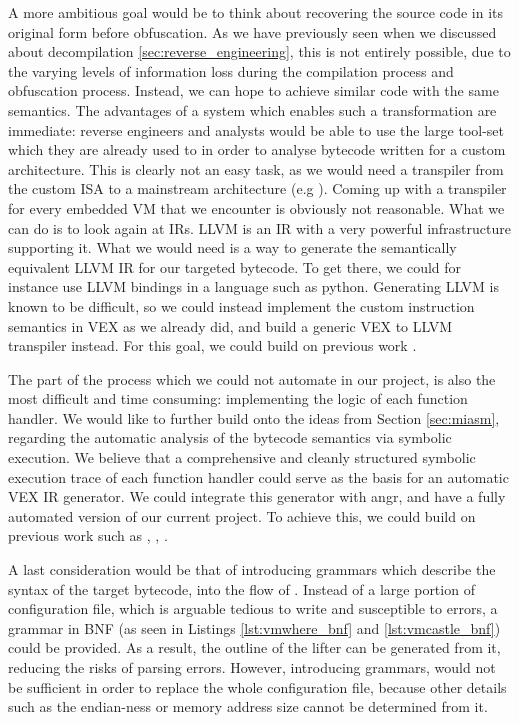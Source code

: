 A more ambitious goal would be to think about recovering the source code in its original form before obfuscation. As we have previously seen when we discussed about decompilation \ref{sec:reverse_engineering}, this is not entirely possible, due to the varying levels of information loss during the compilation process and obfuscation process. Instead, we can hope to achieve similar code with the same semantics. The advantages of a system which enables such a transformation are immediate: reverse engineers and analysts would be able to use the large tool-set which they are already used to in order to analyse bytecode written for a custom architecture. This is clearly not an easy task, as we would need a transpiler from the custom \gls{ISA} to a mainstream architecture (e.g ). Coming up with a transpiler for every embedded \gls{VM} that we encounter is obviously not reasonable. What we can do is to look again at \glspl{IR}. LLVM \cite{llvm} is an \gls{IR} with a very powerful infrastructure supporting it. What we would need is a way to generate the semantically equivalent LLVM \gls{IR} for our targeted bytecode. To get there, we could for instance use LLVM bindings in a language such as python. Generating LLVM is known to be difficult, so we could instead implement the custom instruction semantics in VEX as we already did, and build a generic VEX to LLVM transpiler instead. For this goal, we could build on previous work \cite{symbolic_deobf_2018}.

The part of the process which we could not automate in our project, is also the most difficult and time consuming: implementing the logic of each function handler. We would like to further build onto the ideas from Section \ref{sec:miasm}, regarding the automatic analysis of the bytecode semantics via symbolic execution. We believe that a comprehensive and cleanly structured symbolic execution trace of each function handler could serve as the basis for an automatic VEX \gls{IR} generator. We could integrate this generator with angr, and have a fully automated version of our current project. To achieve this, we could build on previous work such as \cite{dang2014practical}, \cite{liang2018}, \cite{symbolic_deobf_2018}.

A last consideration would be that of introducing grammars which describe the syntax of the target bytecode, into the flow of . Instead of a large portion of configuration file, which is arguable tedious to write and susceptible to errors, a grammar in \gls{BNF} (as seen in Listings \ref{lst:vmwhere_bnf} and \ref{lst:vmcastle_bnf}) could be provided. As a result, the outline of the lifter can be generated from it, reducing the risks of parsing errors. However, introducing grammars, would not be sufficient in order to replace the whole configuration file, because other details such as the endian-ness or memory address size cannot be determined from it.

